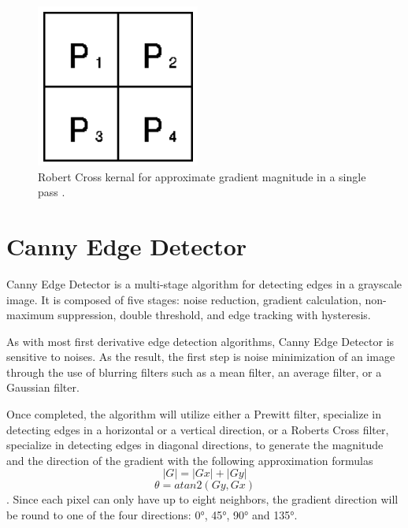 \documentclass[conference]{IEEEtran}
\begin{document}
\begin{figure}[!htb]
    \centering
    \includegraphics[scale = 0.3]{RC_AK.PNG}
    \caption{Robert Cross kernal for approximate gradient magnitude in a single pass \cite{fisher-perkins-walker-wolfart:2003}.}
\end{figure}

\section{Canny Edge Detector}
Canny Edge Detector is a multi-stage algorithm for detecting edges in a grayscale image. It is composed of five stages: noise reduction, gradient calculation, non-maximum suppression, double threshold, and edge tracking with hysteresis.

As with most first derivative edge detection algorithms, Canny Edge Detector is sensitive to noises. As the result, the first step is noise minimization of an image through the use of blurring filters such as a mean filter, an average filter, or a Gaussian filter.

Once completed, the algorithm will utilize either a Prewitt filter, specialize in detecting edges in a horizontal or a vertical direction, or a Roberts Cross filter, specialize in detecting edges in diagonal directions, to generate the magnitude and the direction of the gradient with the following approximation formulas \cite{sofiane-sahir:2019} \[|G|=|Gx|+|Gy|\] \[\theta = atan2(Gy,Gx)\]. Since each pixel can only have up to eight neighbors, the gradient direction will be round to one of the four directions: 0°, 45°, 90° and 135°.
\end{document}
